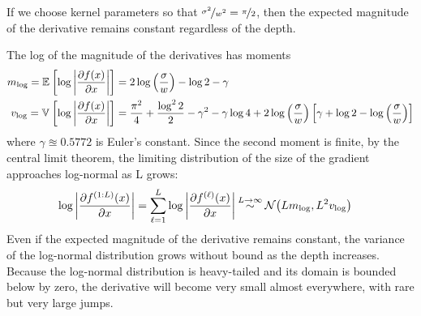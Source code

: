 If we choose kernel parameters so that ${\nicefrac{\sigma^2}{w^2} = \nicefrac{\pi}{2}}$, then the expected magnitude of the derivative remains constant regardless of the depth.


The log of the magnitude of the derivatives has moments
\begin{align}
m_{\log} = \mathbb{E}_{} \left[ {\log \left| \frac{\partial f(x)}{\partial x} \right|} \right] & = 2 \log \left( \frac{\sigma}{w} \right) - \log2 - \gamma \nonumber \\
v_{\log} = \mathbb{V}_{} \left[ {\log \left| \frac{\partial f(x)}{\partial x} \right|} \right] & = \frac{\pi^2}{4} + \frac{\log^2 2}{2}  - \gamma^2 - \gamma \log4 + 2 \log\left(\frac{\sigma}{w}\right) \left[ \gamma + \log2 - \log \left(\frac{\sigma}{w}\right) \right]
\end{align}
where $\gamma \approxeq 0.5772$ is Euler's constant.  Since the second moment is finite, by the central limit theorem, the limiting distribution of the size of the gradient approaches log-normal as L grows:
\begin{align}
\log \left| \frac{\partial f^{(1:L)}(x)}{\partial x} \right| 
& = \sum_{\ell=1}^L \log \left| \frac{\partial f^{(\ell)}(x)}{\partial x} \right| 
\mathbin{\overset{L \rightarrow \infty}{\sim}} \mathcal{N}\!\left( L m_{\log} ,L^2 v_{\log}\right)
\end{align}
%
Even if the expected magnitude of the derivative remains constant, the variance of the log-normal distribution grows without bound as the depth increases.  Because the log-normal distribution is heavy-tailed and its domain is bounded below by zero, the derivative will become very small almost everywhere, with rare but very large jumps.  

